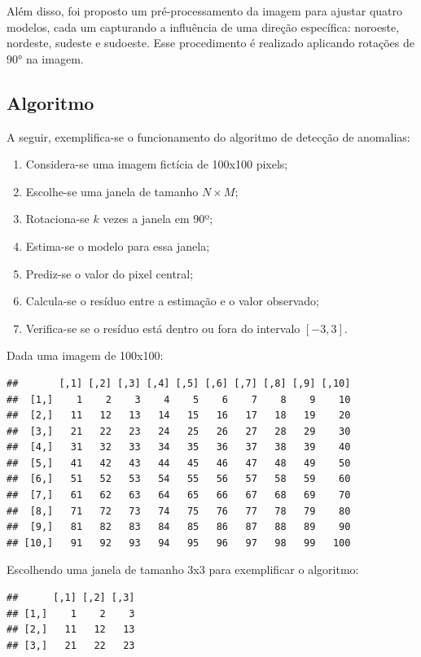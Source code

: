 \documentclass[
]{article}
\begin{document}
Além disso, foi proposto um pré-processamento da imagem para ajustar quatro modelos, cada um capturando a influência de uma direção específica: noroeste, nordeste, sudeste e sudoeste. Esse procedimento é realizado aplicando rotações de 90° na imagem.

\hypertarget{algoritmo}{%
\subsection{Algoritmo}\label{algoritmo}}

A seguir, exemplifica-se o funcionamento do algoritmo de detecção de anomalias:

\begin{enumerate}
  \item Considera-se uma imagem fictícia de 100x100 pixels;
  \item Escolhe-se uma janela de tamanho \(N \times M\);
  \item Rotaciona-se \(k\) vezes a janela em 90º;
  \item Estima-se o modelo para essa janela;
  \item Prediz-se o valor do pixel central;
  \item Calcula-se o resíduo entre a estimação e o valor observado;
  \item Verifica-se se o resíduo está dentro ou fora do intervalo \([-3, 3]\).
\end{enumerate}

Dada uma imagem de 100x100:

\begin{verbatim}
##       [,1] [,2] [,3] [,4] [,5] [,6] [,7] [,8] [,9] [,10]
##  [1,]    1    2    3    4    5    6    7    8    9    10
##  [2,]   11   12   13   14   15   16   17   18   19    20
##  [3,]   21   22   23   24   25   26   27   28   29    30
##  [4,]   31   32   33   34   35   36   37   38   39    40
##  [5,]   41   42   43   44   45   46   47   48   49    50
##  [6,]   51   52   53   54   55   56   57   58   59    60
##  [7,]   61   62   63   64   65   66   67   68   69    70
##  [8,]   71   72   73   74   75   76   77   78   79    80
##  [9,]   81   82   83   84   85   86   87   88   89    90
## [10,]   91   92   93   94   95   96   97   98   99   100
\end{verbatim}

Escolhendo uma janela de tamanho 3x3 para exemplificar o algoritmo:

\begin{verbatim}
##      [,1] [,2] [,3]
## [1,]    1    2    3
## [2,]   11   12   13
## [3,]   21   22   23
\end{verbatim}
\end{document}
